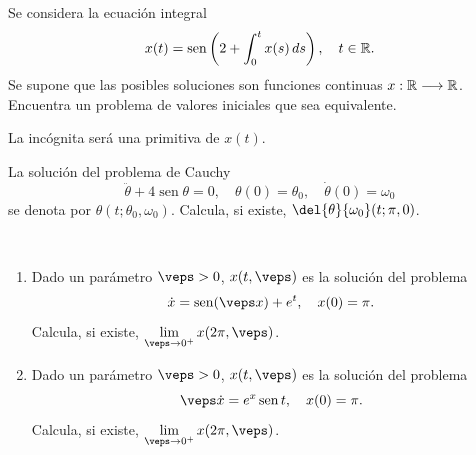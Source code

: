 \documentclass[12pt]{article}
\begin{document}
    \begin{ejercicio}
        Se considera la ecuación integral
        \[
        x(t) = \operatorname{sen}\left(2 + \int_{0}^{t} x(s) \, ds\right), \quad t \in \mathbb{R}.
        \]
        Se supone que las posibles soluciones son funciones continuas $x : \mathbb{R} \longrightarrow \mathbb{R}$. Encuentra un problema de valores iniciales que sea equivalente.
        \begin{observacion}
            La incógnita será una primitiva de $x(t)$.
        \end{observacion}
    \end{ejercicio}

    \begin{ejercicio}
        La solución del problema de Cauchy
        \[
        \ddot{\theta} + 4 \operatorname{sen} \theta = 0, \quad \theta(0) = \theta_0, \quad \dot{\theta}(0) = \omega_0
        \]
        se denota por $\theta(t; \theta_0, \omega_0)$. Calcula, si existe, $\del{\theta}{\omega_0}(t; \pi, 0)$.
    \end{ejercicio}

    \begin{ejercicio}~
        \begin{enumerate}[label=\roman*)]
            \item Dado un parámetro $\veps > 0$, $x(t, \veps)$ es la solución del problema
            \[
            \dot{x} = \operatorname{sen}(\veps x) + e^t, \quad x(0) = \pi.
            \]
            Calcula, si existe, $\lim\limits_{\veps \to 0^+} x(2\pi, \veps)$.
            \item Dado un parámetro $\veps > 0$, $x(t, \veps)$ es la solución del problema
            \[
            \veps \dot{x} = e^x \operatorname{sen} t, \quad x(0) = \pi.
            \]
            Calcula, si existe, $\lim\limits_{\veps \to 0^+} x(2\pi, \veps)$.
        \end{enumerate}
    \end{ejercicio}

\end{document}
